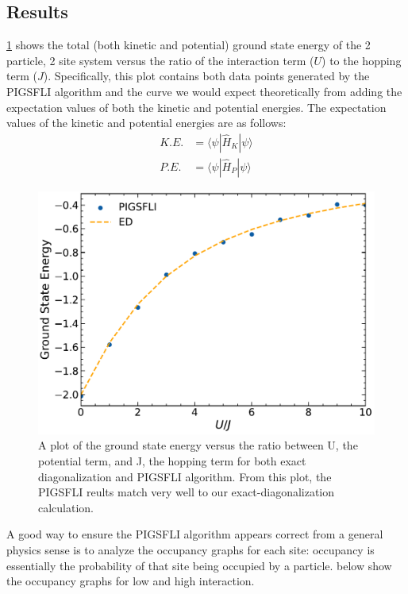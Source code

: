 \subsection{Results}

\cref*{fig:total_energy} shows the total (both kinetic and potential) ground state energy of the 2 particle, 2 site system versus the ratio of the interaction term ($U$) to the hopping term ($J$). Specifically, this plot contains both data points generated by the PIGSFLI algorithm and the curve we would expect theoretically from adding the expectation values of both the kinetic and potential energies. The expectation values of the kinetic and potential energies are as follows: 
\begin{align*}
    K.E. &= \langle \psi | \hat{H}_K | \psi \rangle \\
    P.E. &= \langle \psi | \hat{H}_P | \psi \rangle
\end{align*}
\begin{figure}[H]
\centering
\includegraphics[scale=0.5]{../figures/total_energy.pdf}
\caption{A plot of the ground state energy versus the ratio between U, the potential term, and J, the hopping term for both exact diagonalization and PIGSFLI algorithm. From this plot, the PIGSFLI reults match very well to our exact-diagonalization calculation.}
\label{fig:total_energy}
\end{figure}

A good way to ensure the PIGSFLI algorithm appears correct from a general physics sense is to analyze the occupancy graphs for each site: occupancy is essentially the probability of that site being occupied by a particle.  below show the occupancy graphs for low and high interaction.

